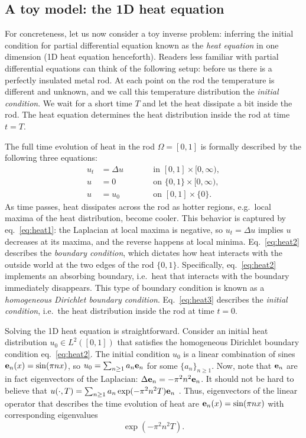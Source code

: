 \subsection{A toy model: the 1D heat equation}\label{subsec:toy}
For concreteness, let us now consider a toy inverse problem: inferring
the initial condition for partial differential equation known as the
\emph{heat equation} in one dimension (1D heat equation
henceforth). Readers less familiar with partial differential equations
can think of the following setup: before us there is a perfectly
insulated metal rod. At each point on the rod the temperature is
different and unknown, and we call this temperature distribution the
\emph{initial condition}. We wait for a short time $T$ and let the
heat dissipate a bit inside the rod. The heat equation determines the
heat distribution inside the rod at time $t=T$.

The full time evolution of heat in the rod $\Omega=[0,1]$ is formally
described by the following three equations:
\begin{subequations}
  \begin{alignat}{2}
    u_t &= \Delta u &&\qquad \text{in } [0,1] \times [0,\infty), \label{eq:heat1}\\
    u &= 0 &&\qquad \text{on } \{0, 1\} \times [0,\infty), \label{eq:heat2}\\
    u &= u_0 &&\qquad \text{on }[0,1] \times \{0\}. \label{eq:heat3}
  \end{alignat}
\end{subequations}
As time passes, heat dissipates across the rod as hotter regions,
e.g.~local maxima of the heat distribution, become cooler. This
behavior is captured by eq.~\eqref{eq:heat1}: the Laplacian at local
maxima is negative, so $u_t = \Delta u$ implies $u$ decreases at its
maxima, and the reverse happens at local minima. Eq.~\eqref{eq:heat2}
describes the \emph{boundary condition}, which dictates how heat
interacts with the outside world at the two edges of the rod
$\{0,1\}$. Specifically, eq.~\eqref{eq:heat2} implements an absorbing
boundary, i.e.~heat that interacts with the boundary immediately
disappears. This type of boundary condition is known as a
\emph{homogeneous Dirichlet boundary condition}. Eq.~\eqref{eq:heat3}
describes the \emph{initial condition}, i.e.~the heat distribution
inside the rod at time $t=0$.

Solving the 1D heat equation is straightforward. Consider an initial
heat distribution $u_0\in L^2([0,1])$ that satisfies the homogeneous
Dirichlet boundary condition eq.~\eqref{eq:heat2}. The initial
condition $u_0$ is a linear combination of sines $\mathbf{e}_n(x) = \sin(\pi
n x)$, so $u_0 = \sum_{n\geq 1} a_n \mathbf{e}_n$ for some $\{a_n\}_{n\geq
  1}$. Now, note that $\mathbf{e}_n$ are in fact eigenvectors of the
Laplacian: $\Delta \mathbf{e}_n = -\pi^2 n^2\mathbf{e}_n$. It should not be hard to
believe that $u(\cdot, T) = \sum_{n\geq 1} a_n \exp(-\pi^2 n^2T )
\mathbf{e}_n$ \cite{renardy2006PDE}. Thus, eigenvectors of the linear
operator that describes the time evolution of heat are $\mathbf{e}_n(x) =
\sin(\pi n x)$ with corresponding eigenvalues
\begin{equation}\label{eq:decay}
  \exp(-\pi^2 n^2T ).
\end{equation}

